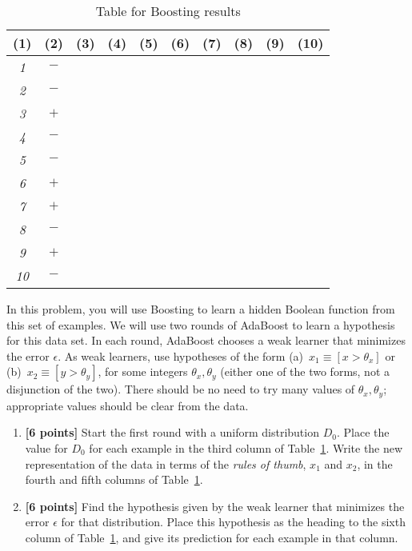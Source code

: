 \begin{enumerate}
\begin{table}[!t]
{\begin{tabular}{|c|c||c|c|c|c||c|c|c|c|}
          \tiny{(1)} & \tiny{(2)} & \tiny{(3)} & \tiny{(4)} &  \tiny{(5)} & \tiny{(6)} & \tiny{(7)} & \tiny{(8)} & \tiny{(9)} & \tiny{(10)}\\
          \hline \hline
          {\em 1} & $-$ & & & & & & & &  \\
          \hline
          {\em 2} & $-$ & & & & & & & &  \\
          \hline
          {\em 3} & $+$ & & & & & & & & \\
          \hline
          {\em 4} & $-$ & & & & & & & & \\
          \hline
          {\em 5} & $-$ & & & & & & & & \\
          \hline
          {\em 6} & $+$ & & & & & & & & \\
          \hline
          {\em 7} & $+$ & & & & & & & & \\
          \hline
          {\em 8} & $-$ & & & & & & & & \\
          \hline
          {\em 9} & $+$ & & & & & & & & \\
          \hline
          {\em 10} & $-$ & & & & & & & & \\
          \hline
        \end{tabular}
        \caption{Table for Boosting results} \label{table:ltu}}
    \end{table}


  In this problem, you will use Boosting to learn a hidden Boolean function from this set of examples.
We will use two rounds of AdaBoost to learn a hypothesis for this
    data set. In each round, AdaBoost chooses a weak learner that minimizes the error $\epsilon$. As weak learners, use hypotheses of the form (a)~$x_1 \equiv [x
    > \theta_x]$ or (b)~$x_2 \equiv [y > \theta_y]$, for some integers $\theta_x, \theta_y$ (either one of the two forms, not a disjunction of the two). There should be no need to try many values of $\theta_x, \theta_y$;
    appropriate values should be clear from the data.


  \begin{enumerate}
  \item {\bf [6 points]}  Start the first round with a uniform distribution $D_0$.  Place the value for
    $D_0$ for each example in the third column of Table~\ref{table:ltu}.
Write the new representation of the data in terms of the {\em rules of thumb}, $x_1$ and $x_2$, in the fourth and fifth columns of Table~\ref{table:ltu}.

  \item {\bf [6 points]}
    Find the hypothesis given by the weak learner that minimizes the error
    $\epsilon$ for that distribution.  Place this hypothesis as the heading to the
    sixth column of Table~\ref{table:ltu}, and give its prediction for each example in that column.


\end{enumerate}
\end{enumerate}
